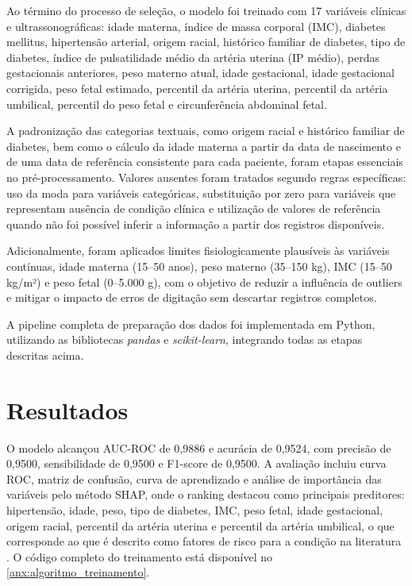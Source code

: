\documentclass[12pt, a4paper]{report}
\theoremstyle{definition}
\theoremstyle{remark}
\theoremstyle{plain}
\begin{document}
Ao término do processo de seleção, o modelo foi treinado com 17 variáveis clínicas e ultrassonográficas: idade materna, índice de massa corporal (IMC), diabetes mellitus, hipertensão arterial, origem racial, histórico familiar de diabetes, tipo de diabetes, índice de pulsatilidade médio da artéria uterina (IP médio), perdas gestacionais anteriores, peso materno atual, idade gestacional, idade gestacional corrigida, peso fetal estimado, percentil da artéria uterina, percentil da artéria umbilical, percentil do peso fetal e circunferência abdominal fetal.

A padronização das categorias textuais, como origem racial e histórico familiar de diabetes, bem como o cálculo da idade materna a partir da data de nascimento e de uma data de referência consistente para cada paciente, foram etapas essenciais no pré-processamento. Valores ausentes foram tratados segundo regras específicas: uso da moda para variáveis categóricas, substituição por zero para variáveis que representam ausência de condição clínica e utilização de valores de referência quando não foi possível inferir a informação a partir dos registros disponíveis.

Adicionalmente, foram aplicados limites fisiologicamente plausíveis às variáveis contínuas, idade materna (15–50 anos), peso materno (35–150 kg), IMC (15–50 kg/m²) e peso fetal (0–5.000 g), com o objetivo de reduzir a influência de outliers e mitigar o impacto de erros de digitação sem descartar registros completos.

A pipeline completa de preparação dos dados foi implementada em Python, utilizando as bibliotecas \textit{pandas} e \textit{scikit-learn}, integrando todas as etapas descritas acima.

\section{Resultados}

O modelo alcançou AUC-ROC de 0,9886 e acurácia de 0,9524, com precisão de 0,9500, sensibilidade de 0,9500 e F1-score de 0,9500. A avaliação incluiu curva ROC, matriz de confusão, curva de aprendizado e análise de importância das variáveis pelo método SHAP, onde o ranking destacou como principais preditores: hipertensão, idade, peso, tipo de diabetes, IMC, peso fetal, idade gestacional, origem racial, percentil da artéria uterina e percentil da artéria umbilical, o que corresponde ao que é descrito como fatores de risco para a condição na literatura \cite{Maayeh_2020}. O código completo do treinamento está disponível no \autoref{anx:algoritmo_treinamento}.
\end{document}
